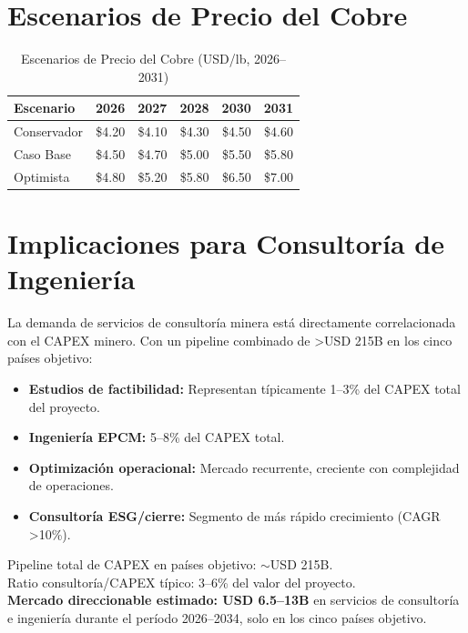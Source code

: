 \section{Escenarios de Precio del Cobre}

\begin{table}[htbp]
\centering
\caption{Escenarios de Precio del Cobre (USD/lb, 2026--2031)}
\begin{tabular}{@{}lrrrrr@{}}
\toprule
\textbf{Escenario} & \textbf{2026} & \textbf{2027} & \textbf{2028} & \textbf{2030} & \textbf{2031} \\
\midrule
Conservador & \$4.20 & \$4.10 & \$4.30 & \$4.50 & \$4.60 \\
\rowcolor{tablealt} Caso Base & \$4.50 & \$4.70 & \$5.00 & \$5.50 & \$5.80 \\
Optimista & \$4.80 & \$5.20 & \$5.80 & \$6.50 & \$7.00 \\
\bottomrule
\end{tabular}
\label{tab:copper_scenarios}
\end{table}

\section{Implicaciones para Consultoría de Ingeniería}

La demanda de servicios de consultoría minera está directamente correlacionada con el CAPEX minero. Con un pipeline combinado de >USD 215B en los cinco países objetivo:

\begin{itemize}
    \item \textbf{Estudios de factibilidad:} Representan típicamente 1--3\% del CAPEX total del proyecto.
    \item \textbf{Ingeniería EPCM:} 5--8\% del CAPEX total.
    \item \textbf{Optimización operacional:} Mercado recurrente, creciente con complejidad de operaciones.
    \item \textbf{Consultoría ESG/cierre:} Segmento de más rápido crecimiento (CAGR >10\%).
\end{itemize}

\begin{opportunitybox}
Pipeline total de CAPEX en países objetivo: $\sim$USD 215B. \\
Ratio consultoría/CAPEX típico: 3--6\% del valor del proyecto. \\
\textbf{Mercado direccionable estimado: USD 6.5--13B} en servicios de consultoría e ingeniería durante el período 2026--2034, solo en los cinco países objetivo.
\end{opportunitybox}
